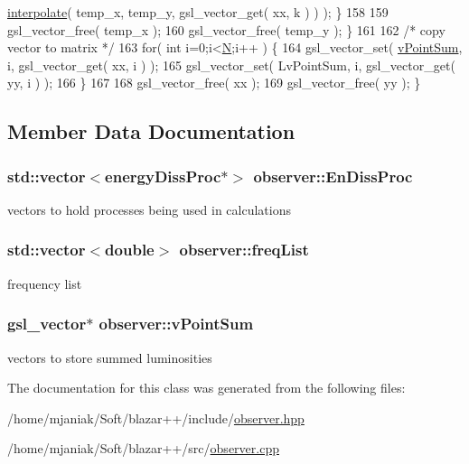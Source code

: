 \begin{DoxyCode}
      \hyperlink{classobserver_af7fe35310b73997a7dab21cd6d4141db}{interpolate}( temp\_x, temp\_y, gsl\_vector\_get( xx, k ) ) ); \}
158     
159     gsl\_vector\_free( temp\_x );
160     gsl\_vector\_free( temp\_y ); \}
161   
162   \textcolor{comment}{/* copy vector to matrix */}
163   \textcolor{keywordflow}{for}( \textcolor{keywordtype}{int} i=0;i<\hyperlink{classbaseClass_a2b4d07d2b46197d495de0477f4bb22f8}{N};i++ ) \{
164     gsl\_vector\_set( \hyperlink{classobserver_aef3c4770dc82fdb0d2ac7143e184cbc3}{vPointSum}, i, gsl\_vector\_get( xx, i ) );    
165     gsl\_vector\_set( LvPointSum, i, gsl\_vector\_get( yy, i ) );
166  \}
167   
168   gsl\_vector\_free( xx );
169   gsl\_vector\_free( yy ); \}
\end{DoxyCode}


\subsection{Member Data Documentation}
\hypertarget{classobserver_aeb5a8afa2221e268e06f74600acac7af}{
\subsubsection[{En\-Diss\-Proc}]{\setlength{\rightskip}{0pt plus 5cm}std\-::vector$<${\bf energy\-Diss\-Proc}$\ast$$>$ observer\-::\-En\-Diss\-Proc}}\label{classobserver_aeb5a8afa2221e268e06f74600acac7af}
vectors to hold processes being used in calculations \hypertarget{classobserver_a64f3e868a83ea1c693a329aba1f83560}{
\subsubsection[{freq\-List}]{\setlength{\rightskip}{0pt plus 5cm}std\-::vector$<$double$>$ observer\-::freq\-List}}\label{classobserver_a64f3e868a83ea1c693a329aba1f83560}
frequency list \hypertarget{classobserver_aef3c4770dc82fdb0d2ac7143e184cbc3}{
\subsubsection[{v\-Point\-Sum}]{\setlength{\rightskip}{0pt plus 5cm}gsl\-\_\-vector$\ast$ observer\-::v\-Point\-Sum}}\label{classobserver_aef3c4770dc82fdb0d2ac7143e184cbc3}
vectors to store summed luminosities 

The documentation for this class was generated from the following files\-:\begin{DoxyCompactItemize}
\item 
/home/mjaniak/\-Soft/blazar++/include/\hyperlink{observer_8hpp}{observer.\-hpp}\item 
/home/mjaniak/\-Soft/blazar++/src/\hyperlink{observer_8cpp}{observer.\-cpp}\end{DoxyCompactItemize}
